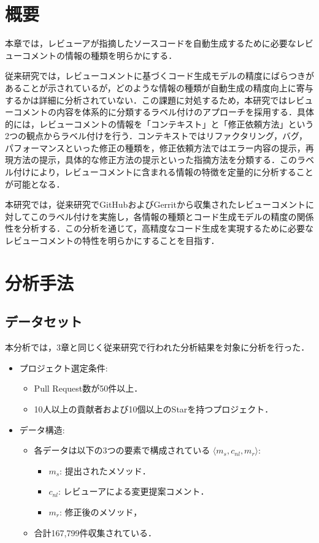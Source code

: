 \documentclass[11pt]{jreport}
\begin{document}
\section{概要}
本章では，レビューアが指摘したソースコードを自動生成するために必要なレビューコメントの情報の種類を明らかにする．

従来研究では，レビューコメントに基づくコード生成モデルの精度にばらつきがあることが示されているが，どのような情報の種類が自動生成の精度向上に寄与するかは詳細に分析されていない．この課題に対処するため，本研究ではレビューコメントの内容を体系的に分類するラベル付けのアプローチを採用する．具体的には，レビューコメントの情報を「コンテキスト」と「修正依頼方法」という2つの観点からラベル付けを行う．コンテキストではリファクタリング，バグ，パフォーマンスといった修正の種類を，修正依頼方法ではエラー内容の提示，再現方法の提示，具体的な修正方法の提示といった指摘方法を分類する．このラベル付けにより，レビューコメントに含まれる情報の特徴を定量的に分析することが可能となる．

本研究では，従来研究でGitHubおよびGerritから収集されたレビューコメントに対してこのラベル付けを実施し，各情報の種類とコード生成モデルの精度の関係性を分析する．この分析を通じて，高精度なコード生成を実現するために必要なレビューコメントの特性を明らかにすることを目指す．

\section{分析手法}


\subsection {データセット}
本分析では，3章と同じく従来研究で行われた分析結果を対象に分析を行った．

\begin{itemize}
    \item プロジェクト選定条件:
    \begin{itemize}
        \item Pull Request数が50件以上．
        \item 10人以上の貢献者および10個以上のStarを持つプロジェクト．
    \end{itemize}
    \item データ構造:
    \begin{itemize}
        \item 各データは以下の3つの要素で構成されている $\langle m_s, c_{nl}, m_r \rangle$:
        \begin{itemize}
            \item $m_s$: 提出されたメソッド．
            \item $c_{nl}$: レビューアによる変更提案コメント．
            \item $m_r$: 修正後のメソッド，
        \end{itemize}
        \item 合計167,799件収集されている．
    \end{itemize}
\end{itemize}
\end{document}
